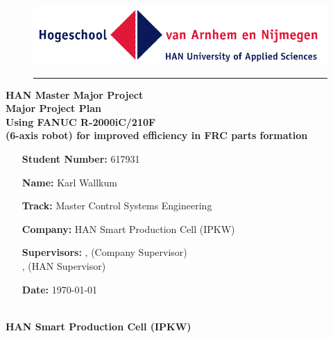 \begin{titlepage}
	\begin{flushright}
	\begin{minipage}{\linewidth}
		\begin{figure}[H]
			\begin{flushright}
			\includegraphics[width=0.5\linewidth]{Images/HAN}
		\end{flushright}
		\hrule
		\end{figure}
		\begin{flushright}
			\large\textbf{ HAN Master Major Project}\\
			\vspace{20pt}
			\Huge\textbf{Major Project Plan
			\\
			\vspace{10pt}
			Using FANUC R-2000iC/210F\\
			(6-axis robot) for improved efficiency in FRC parts formation }
		\end{flushright}
		\vspace{35pt}
		\begin{figure}[H]
		\begin{flushleft}
		\end{flushleft}	
		\end{figure}
		\begin{itemize}[leftmargin=4.5cm]
			\LARGE	
			\item[\textbf{Student Number:}] 617931		
			\item[\textbf{Name:}] Karl Wallkum 			
			\item[\textbf{Track:}] Master Control Systems Engineering
			\item[\textbf{Company:}]  HAN Smart Production Cell (IPKW)
			\item[\textbf{Supervisors:}]  \CompanySupervisor, (Company Supervisor)\\ \HANSupervisor, (HAN Supervisor)			
			\item[\textbf{Date:}] \today		 		
		\end{itemize}
	\end{minipage}
	\end{flushright}

	\begin{flushleft}
	\large \textbf{
		\vspace{40pt}
		\\HAN Smart Production Cell (IPKW)
	}


\end{flushleft}
\end{titlepage}

